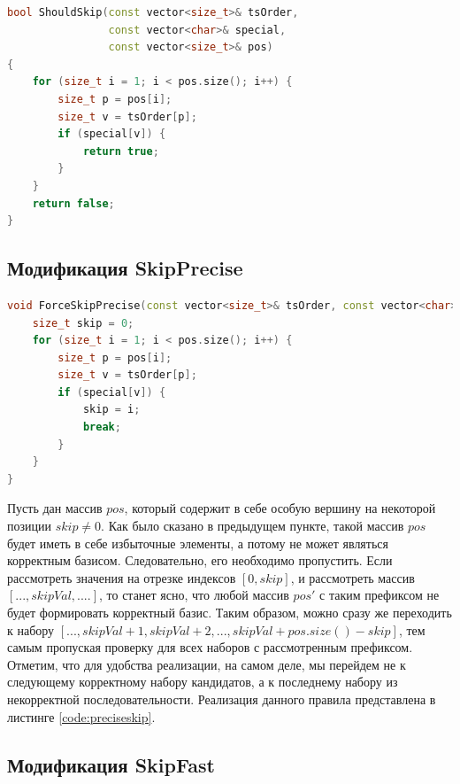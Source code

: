 \documentclass[12pt,a4paper,oneside,openany]{article}
\theoremstyle{definition}
\theoremstyle{lemma}
\theoremstyle{remark}
\begin{document}
\begin{lstlisting}[language=C++, caption=Проверка множества на наличие доминируемых вершин, label=code:shouldskip]
bool ShouldSkip(const vector<size_t>& tsOrder,
                const vector<char>& special,
                const vector<size_t>& pos)
{
    for (size_t i = 1; i < pos.size(); i++) {
        size_t p = pos[i];
        size_t v = tsOrder[p];
        if (special[v]) {
            return true;
        }
    }
    return false;
}
\end{lstlisting}

\subsection{Модификация SkipPrecise}\label{subsec:preciseskip}

\begin{lstlisting}[language=C++, caption=Пропуск сразу нескольких наборов кандидатов без ложно-отрицательных результатов, label=code:preciseskip]
void ForceSkipPrecise(const vector<size_t>& tsOrder, const vector<char>& special, std::vector<size_t>& pos) {
    size_t skip = 0;
    for (size_t i = 1; i < pos.size(); i++) {
        size_t p = pos[i];
        size_t v = tsOrder[p];
        if (special[v]) {
            skip = i;
            break;
        }
    }
}
\end{lstlisting}



Пусть дан массив $pos$, который содержит в себе особую вершину на некоторой позиции $skip \neq 0$.
Как было сказано в предыдущем пункте, такой массив $pos$ будет иметь в себе избыточные элементы, а
потому не может являться корректным базисом. Следовательно, его необходимо пропустить.
Если рассмотреть значения на отрезке индексов $[0, skip]$, и рассмотреть массив $[..., skipVal, ....]$, то станет ясно, что любой массив $pos'$
с таким префиксом не будет формировать корректный базис. Таким образом, можно сразу же переходить
к набору $[..., skipVal + 1, skipVal + 2, ..., skipVal + pos.size() - skip]$,
тем самым пропуская проверку для всех наборов с рассмотренным префиксом.
Отметим, что для удобства реализации, на самом деле, мы перейдем не к следующему корректному набору
кандидатов, а к последнему набору из некорректной последовательности.
Реализация данного правила представлена в листинге \ref{code:preciseskip}.

\subsection{Модификация SkipFast}\label{subsec:fastskip}
\end{document}
